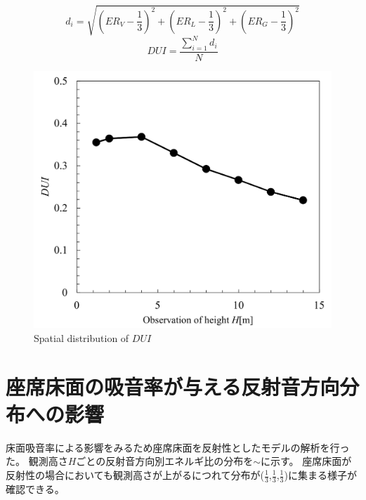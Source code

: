 \begin{table}[htbp]
\begin{equation}
  \label{eq:di}
  d_i = \sqrt{\left({ER_V-\frac{1}{3}}\right)^2 + \left(ER_L-\frac{1}{3}\right)^2 + \left(ER_G-\frac{1}{3}\right)^2} 
\end{equation}
\begin{equation}
    \label{eq:DUI}
    DUI=\frac{\sum_{i=1}^N{d_i}}{N}
\end{equation}
\end{table}

\begin{figure}[p]
    \centering
    \includegraphics[keepaspectratio,scale=0.7]{05_att/DUI_abs2.pdf}
    \caption{\hspace{1mm}Spatial distribution of $DUI$}
    \label{fig:DUI_abs}
\end{figure}

\clearpage
\section{座席床面の吸音率が与える反射音方向分布への影響}
床面吸音率による影響をみるため座席床面を反射性としたモデルの解析を行った。
観測高さ$H$ごとの反射音方向別エネルギ比の分布を$\sim$に示す。
座席床面が反射性の場合においても観測高さが上がるにつれて分布が($\frac{1}{3}$,$\frac{1}{3}$,$\frac{1}{3}$)に集まる様子が確認できる。

